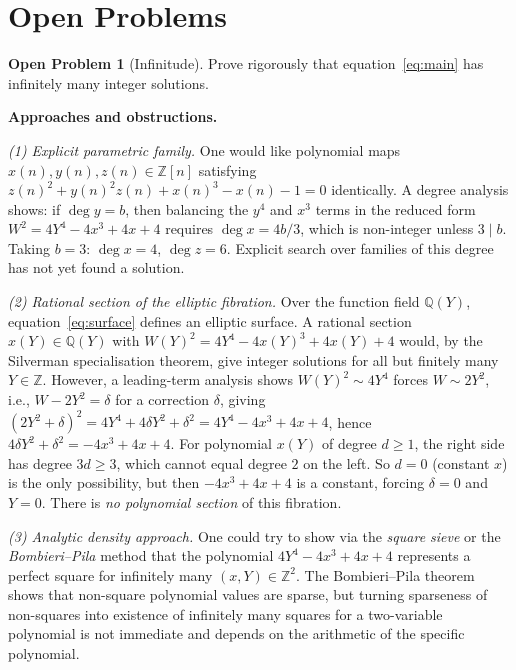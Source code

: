 \documentclass[12pt,a4paper]{article}
\theoremstyle{definition}
\newtheorem{openproblem}[theorem]{Open Problem}
\newcommand{\Z}{\mathbb{Z}}
\newcommand{\Q}{\mathbb{Q}}
\begin{document}
\section{Open Problems}
\label{sec:open}

\begin{openproblem}[Infinitude]\label{op:infinite}
  Prove rigorously that equation~\eqref{eq:main} has infinitely many integer
  solutions.
\end{openproblem}

\noindent\textbf{Approaches and obstructions.}

\medskip\noindent\emph{(1) Explicit parametric family.}
One would like polynomial maps $x(n), y(n), z(n)\in\Z[n]$ satisfying
$z(n)^2 + y(n)^2 z(n) + x(n)^3 - x(n) - 1 = 0$ identically.  A degree
analysis shows: if $\deg y = b$, then balancing the $y^4$ and $x^3$ terms
in the reduced form $W^2 = 4Y^4-4x^3+4x+4$ requires $\deg x = 4b/3$, which
is non-integer unless $3\mid b$.  Taking $b=3$: $\deg x = 4$, $\deg z = 6$.
Explicit search over families of this degree has not yet found a solution.

\medskip\noindent\emph{(2) Rational section of the elliptic fibration.}
Over the function field $\Q(Y)$, equation~\eqref{eq:surface} defines an
elliptic surface.  A rational section $x(Y)\in\Q(Y)$ with $W(Y)^2 =
4Y^4-4x(Y)^3+4x(Y)+4$ would, by the Silverman specialisation theorem,
give integer solutions for all but finitely many $Y\in\Z$.  However,
a leading-term analysis shows $W(Y)^2 \sim 4Y^4$ forces $W\sim 2Y^2$,
i.e., $W-2Y^2 = \delta$ for a correction $\delta$, giving
$(2Y^2+\delta)^2 = 4Y^4+4\delta Y^2+\delta^2 = 4Y^4-4x^3+4x+4$,
hence $4\delta Y^2+\delta^2 = -4x^3+4x+4$.  For polynomial $x(Y)$
of degree $d\ge1$, the right side has degree $3d \ge 3$, which cannot
equal degree $2$ on the left.  So $d=0$ (constant $x$) is the only
possibility, but then $-4x^3+4x+4$ is a constant, forcing $\delta=0$
and $Y=0$.  There is \emph{no polynomial section} of this fibration.

\medskip\noindent\emph{(3) Analytic density approach.}
One could try to show via the \emph{square sieve} or the
\emph{Bombieri--Pila} method that the polynomial $4Y^4-4x^3+4x+4$
represents a perfect square for infinitely many $(x,Y)\in\Z^2$.
The Bombieri--Pila theorem~\cite{BombieriPila1989} shows that non-square
polynomial values are sparse, but turning sparseness of non-squares into
existence of infinitely many squares for a two-variable polynomial is
not immediate and depends on the arithmetic of the specific polynomial.
\end{document}
